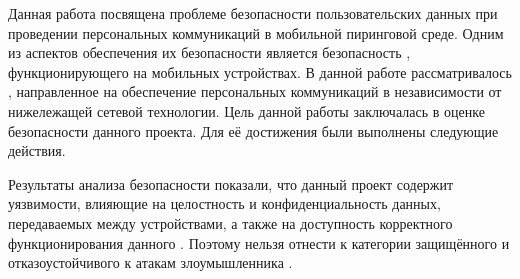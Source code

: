 %
%
Данная работа посвящена проблеме безопасности пользовательских данных при проведении персональных коммуникаций в мобильной пиринговой среде. 
%
Одним из аспектов обеспечения их безопасности является безопасность , функционирующего на мобильных устройствах. 
%
В данной работе рассматривалось  , направленное на обеспечение персональных коммуникаций в независимости от нижележащей сетевой технологии. 
%
Цель данной работы заключалась в оценке безопасности данного проекта. 
%
Для её достижения были выполнены следующие действия. 

%
%
\begin{comment}
понятие безопасности ПО
факторы безопасности ПО
угрозы безопасности ПО
атаки безопасности 
дефекты безопасности
уязвимости безопасности
угрозы безопасности в мобильном и пиринговом окружении
\end{comment}

%
%
\begin{comment}
понятие безопасного ПО
как проводится анализ безопасности ПО
методы белого, серого и чёрного ящика
\end{comment}

%
%
\begin{comment}
концепция
цели
требования
архитектура
проблема безопасности в данном проекте
\end{comment}

%
Результаты анализа безопасности  показали, что данный проект содержит уязвимости, влияющие на целостность и конфиденциальность данных, передаваемых между устройствами, а также на доступность корректного функционирования данного . 
%
Поэтому  нельзя отнести к категории защищённого и отказоустойчивого к атакам злоумышленника . 
%
\begin{comment}
постановка целей и задач
анализ спецификации
моделирование рисков
тестирование безопасности
\end{comment}

%
%
\begin{comment}


===

Преимущества предлагаемого варианта решения или предмета рассмотрения
Нерешённые задачи 
Небольшая доля критики насчёт полученных выводов и результатов (Оценка соответствия теории и измерений)
Подтвердилась ли гипотеза или нет, или требует модификации
\end{comment}

